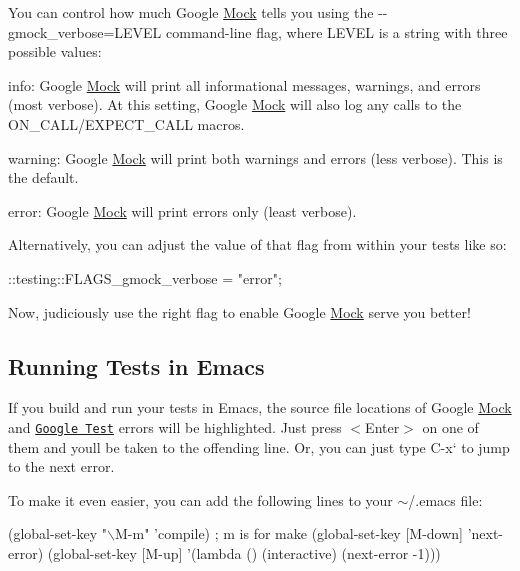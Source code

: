 You can control how much Google \hyperlink{class_mock}{Mock} tells you using the {\ttfamily -\/-\/gmock\+\_\+verbose=L\+E\+V\+EL} command-\/line flag, where {\ttfamily L\+E\+V\+EL} is a string with three possible values\+:


\begin{DoxyItemize}
\item {\ttfamily info}\+: Google \hyperlink{class_mock}{Mock} will print all informational messages, warnings, and errors (most verbose). At this setting, Google \hyperlink{class_mock}{Mock} will also log any calls to the {\ttfamily O\+N\+\_\+\+C\+A\+L\+L/\+E\+X\+P\+E\+C\+T\+\_\+\+C\+A\+LL} macros.
\item {\ttfamily warning}\+: Google \hyperlink{class_mock}{Mock} will print both warnings and errors (less verbose). This is the default.
\item {\ttfamily error}\+: Google \hyperlink{class_mock}{Mock} will print errors only (least verbose).
\end{DoxyItemize}

Alternatively, you can adjust the value of that flag from within your tests like so\+:


\begin{DoxyCode}
::testing::FLAGS\_gmock\_verbose = "error";
\end{DoxyCode}


Now, judiciously use the right flag to enable Google \hyperlink{class_mock}{Mock} serve you better!

\subsection*{Running Tests in Emacs}

If you build and run your tests in Emacs, the source file locations of Google \hyperlink{class_mock}{Mock} and \href{http://code.google.com/p/googletest/}{\tt Google Test} errors will be highlighted. Just press {\ttfamily $<$Enter$>$} on one of them and you\textquotesingle{}ll be taken to the offending line. Or, you can just type {\ttfamily C-\/x}` to jump to the next error.

To make it even easier, you can add the following lines to your {\ttfamily $\sim$/.emacs} file\+:


\begin{DoxyCode}
(global-set-key "\(\backslash\)M-m"   'compile)  ; m is for make
(global-set-key [M-down] 'next-error)
(global-set-key [M-up]   '(lambda () (interactive) (next-error -1)))
\end{DoxyCode}


